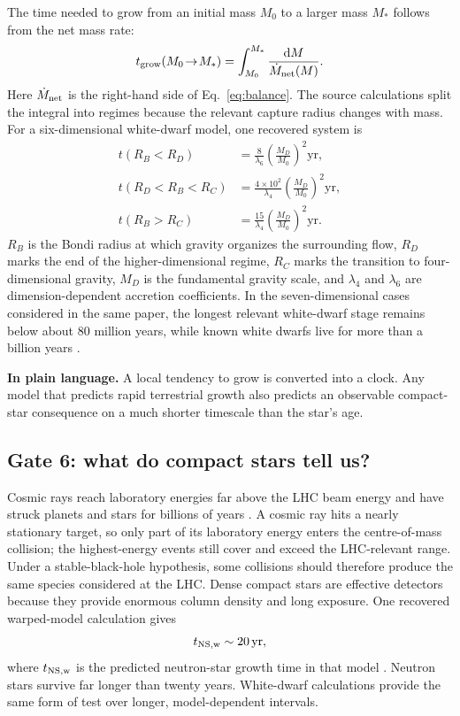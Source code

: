 \documentclass[11pt]{article}
\newcommand{\ud}{\mathrm{d}}
\newcommand{\yr}{\mathrm{yr}}
\newcommand{\plainmeaning}[1]{%
  \par\smallskip\noindent\begingroup\setlength{\fboxsep}{8pt}%
  \colorbox{plainbg}{\parbox{\dimexpr\linewidth-2\fboxsep\relax}{\textbf{In plain language.} #1}}%
  \endgroup\par\smallskip}
\begin{document}
The time needed to grow from an initial mass $M_0$ to a larger mass $M_*$ follows from the net mass rate:
\begin{equation}
t_{\rm grow}(M_0\!\rightarrow\!M_*)=
\int_{M_0}^{M_*}\frac{\ud M}{\dot M_{\rm net}(M)}.
\label{eq:growth-time}
\end{equation}
Here $\dot M_{\rm net}$ is the right-hand side of Eq.~\eqref{eq:balance}. The source calculations split the integral into regimes because the relevant capture radius changes with mass. For a six-dimensional white-dwarf model, one recovered system is \cite{GiddingsMangano2008}
\begin{align}
t(R_B<R_D)&=\frac{8}{\lambda_6}\left(\frac{M_D}{M_0}\right)^2\yr,\nonumber\\
t(R_D<R_B<R_C)&=\frac{4\times10^2}{\lambda_4}\left(\frac{M_D}{M_0}\right)^2\yr,\nonumber\\
t(R_B>R_C)&=\frac{15}{\lambda_4}\left(\frac{M_D}{M_0}\right)^2\yr.
\label{eq:white-dwarf-times}
\end{align}
$R_B$ is the Bondi radius at which gravity organizes the surrounding flow, $R_D$ marks the end of the higher-dimensional regime, $R_C$ marks the transition to four-dimensional gravity, $M_D$ is the fundamental gravity scale, and $\lambda_4$ and $\lambda_6$ are dimension-dependent accretion coefficients. In the seven-dimensional cases considered in the same paper, the longest relevant white-dwarf stage remains below about 80 million years, while known white dwarfs live for more than a billion years \cite{GiddingsMangano2008}.

\plainmeaning{A local tendency to grow is converted into a clock. Any model that predicts rapid terrestrial growth also predicts an observable compact-star consequence on a much shorter timescale than the star's age.}

\subsection{Gate 6: what do compact stars tell us?}

Cosmic rays reach laboratory energies far above the LHC beam energy and have struck planets and stars for billions of years \cite{CERNCosmicRays,Ellis2008}. A cosmic ray hits a nearly stationary target, so only part of its laboratory energy enters the centre-of-mass collision; the highest-energy events still cover and exceed the LHC-relevant range. Under a stable-black-hole hypothesis, some collisions should therefore produce the same species considered at the LHC. Dense compact stars are effective detectors because they provide enormous column density and long exposure. One recovered warped-model calculation gives
\begin{equation}
t_{\rm NS,w}\sim20\,\yr,
\label{eq:neutron-star}
\end{equation}
where $t_{\rm NS,w}$ is the predicted neutron-star growth time in that model \cite{GiddingsMangano2008}. Neutron stars survive far longer than twenty years. White-dwarf calculations provide the same form of test over longer, model-dependent intervals.
\end{document}
